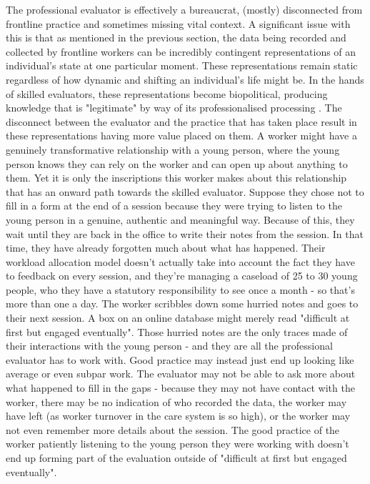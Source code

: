 The professional evaluator is effectively a bureaucrat, (mostly) disconnected from frontline practice and sometimes missing vital context. A significant issue with this is that as mentioned in the previous section, the data being recorded and collected by frontline workers can be incredibly contingent representations of an individual's state at one particular moment. These representations remain static regardless of how dynamic and shifting an individual's life might be. In the hands of skilled evaluators, these representations become biopolitical, producing knowledge that is "legitimate" by way of its professionalised processing \citep{foucault_power_2002}. The disconnect between the evaluator and the practice that has taken place result in these representations having more value placed on them. A worker might have a genuinely transformative relationship with a young person, where the young person knows they can rely on the worker and can open up about anything to them. Yet it is only the inscriptions this worker makes about this relationship that has an onward path towards the skilled evaluator. Suppose they chose not to fill in a form at the end of a session because they were trying to listen to the young person in a genuine, authentic and meaningful way. Because of this, they wait until they are back in the office to write their notes from the session. In that time, they have already forgotten much about what has happened. Their workload allocation model doesn't actually take into account the fact they have to feedback on every session, and they're managing a caseload of 25 to 30 young people, who they have a statutory responsibility to see once a month - so that's more than one a day. The worker scribbles down some hurried notes and goes to their next session. A box on an online database might merely read "difficult at first but engaged eventually". Those hurried notes are the only traces made of their interactions with the young person - and they are all the professional evaluator has to work with. Good practice may instead just end up looking like average or even subpar work. The evaluator may not be able to ask more about what happened to fill in the gaps - because they may not have contact with the worker, there may be no indication of who recorded the data, the worker may have left (as worker turnover in the care system is so high), or the worker may not even remember more details about the session. The good practice of the worker patiently listening to the young person they were working with doesn't end up forming part of the evaluation outside of "difficult at first but engaged eventually". 

